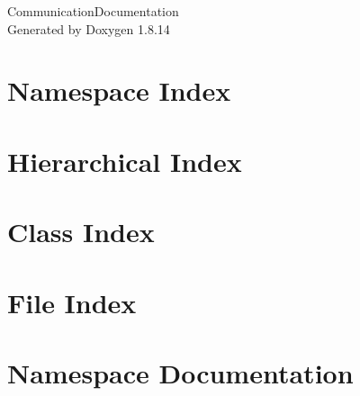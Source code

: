 \documentclass[twoside]{book}
\newcommand{\+}{\discretionary{\mbox{\scriptsize$\hookleftarrow$}}{}{}}
\newcommand{\clearemptydoublepage}{%
  \newpage{\pagestyle{empty}\cleardoublepage}%
}
\begin{document}
\hypersetup{pageanchor=false,
             bookmarksnumbered=true,
             pdfencoding=unicode
            }
\begin{titlepage}
\vspace*{7cm}
\begin{center}%
{\Large Communication\+Documentation }\\
\vspace*{1cm}
{\large Generated by Doxygen 1.8.14}\\
\end{center}
\end{titlepage}
\clearemptydoublepage
{}
\tableofcontents
\clearemptydoublepage
{}
\hypersetup{pageanchor=true}

\chapter{Namespace Index}

\chapter{Hierarchical Index}

\chapter{Class Index}

\chapter{File Index}

\chapter{Namespace Documentation}









\end{document}
